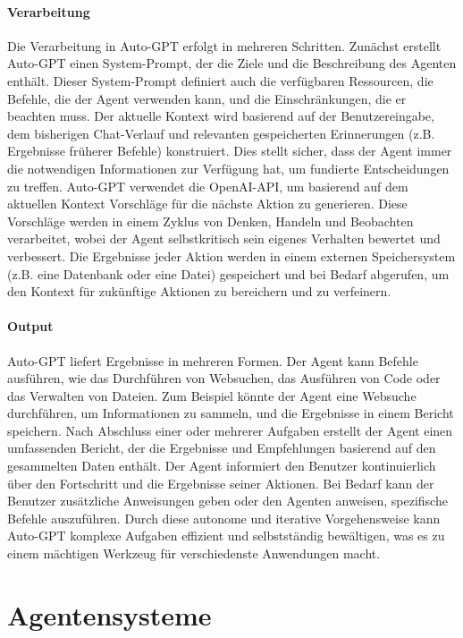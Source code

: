 \documentclass[conference]{IEEEtran}
\begin{document}
\paragraph{Verarbeitung} Die Verarbeitung in Auto-GPT erfolgt in mehreren Schritten. Zunächst erstellt Auto-GPT einen System-Prompt, der die Ziele und die Beschreibung des Agenten enthält. Dieser System-Prompt definiert auch die verfügbaren Ressourcen, die Befehle, die der Agent verwenden kann, und die Einschränkungen, die er beachten muss. Der aktuelle Kontext wird basierend auf der Benutzereingabe, dem bisherigen Chat-Verlauf und relevanten gespeicherten Erinnerungen (z.B. Ergebnisse früherer Befehle) konstruiert. Dies stellt sicher, dass der Agent immer die notwendigen Informationen zur Verfügung hat, um fundierte Entscheidungen zu treffen. Auto-GPT verwendet die OpenAI-API, um basierend auf dem aktuellen Kontext Vorschläge für die nächste Aktion zu generieren. Diese Vorschläge werden in einem Zyklus von Denken, Handeln und Beobachten verarbeitet, wobei der Agent selbstkritisch sein eigenes Verhalten bewertet und verbessert. Die Ergebnisse jeder Aktion werden in einem externen Speichersystem (z.B. eine Datenbank oder eine Datei) gespeichert und bei Bedarf abgerufen, um den Kontext für zukünftige Aktionen zu bereichern und zu verfeinern. \cite{rima_rimabuildsautogpt-handbook_2024}

\paragraph{Output} Auto-GPT liefert Ergebnisse in mehreren Formen. Der Agent kann Befehle ausführen, wie das Durchführen von Websuchen, das Ausführen von Code oder das Verwalten von Dateien. Zum Beispiel könnte der Agent eine Websuche durchführen, um Informationen zu sammeln, und die Ergebnisse in einem Bericht speichern. Nach Abschluss einer oder mehrerer Aufgaben erstellt der Agent einen umfassenden Bericht, der die Ergebnisse und Empfehlungen basierend auf den gesammelten Daten enthält. Der Agent informiert den Benutzer kontinuierlich über den Fortschritt und die Ergebnisse seiner Aktionen. Bei Bedarf kann der Benutzer zusätzliche Anweisungen geben oder den Agenten anweisen, spezifische Befehle auszuführen. Durch diese autonome und iterative Vorgehensweise kann Auto-GPT komplexe Aufgaben effizient und selbstständig bewältigen, was es zu einem mächtigen Werkzeug für verschiedenste Anwendungen macht.
\cite{noauthor_papers_nodate}

\section{Agentensysteme}
\end{document}
